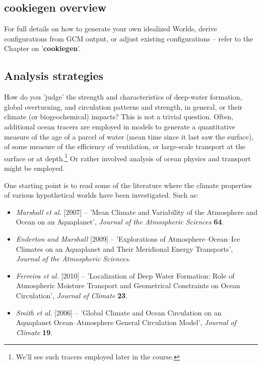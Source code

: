 \vspace{2mm}


\subsection{cookiegen overview}

For full details on how to generate your own idealized Worlds, derive configurations from GCM output, or adjust existing configurations -- refer to the Chapter on '\textbf{cookiegen}'.

\newpage

\subsection{Analysis strategies}

How do you 'judge' the strength and characteristics of deep-water formation, global overturning, and circulation patterns and strength, in general, or their climate (or biogeochemical) impacts? This is not a trivial question. Often, additional ocean tracers are employed in models to generate a quantitative measure of the age of a parcel of water (mean time since it last saw the surface), of some measure of the efficiency of ventilation, or large-scale transport at the surface or at depth.\footnote{We'll see such tracers employed later in the course.} Or rather involved analysis of ocean physics and transport might be employed.

One starting point is to read some of the literature where the climate properties of various hypothetical worlds have been investigated. Such as:
\vspace{1mm}

\begin{itemize}[noitemsep]
\item \textit{Marshall et al.} [2007] -- 'Mean Climate and Variability of the Atmosphere and Ocean on an Aquaplanet', \textit{Journal of the Atmospheric Sciences} \textbf{64}.
\item \textit{Enderton and Marshall} [2009] -- 'Explorations of Atmosphere--Ocean--Ice Climates on an Aquaplanet and Their Meridional Energy Transports', \textit{Journal of the Atmospheric Sciences}.
\item \textit{Ferreira et al.} [2010] -- 'Localization of Deep Water Formation: Role of Atmospheric Moisture Transport and Geometrical Constraints on Ocean Circulation', \textit{Journal of Climate} \textbf{23}.
\item \textit{Smith et al.} [2006] -- 'Global Climate and Ocean Circulation on an Aquaplanet Ocean–Atmosphere General Circulation Model',  \textit{Journal of Climate} \textbf{19}.
\end{itemize}

